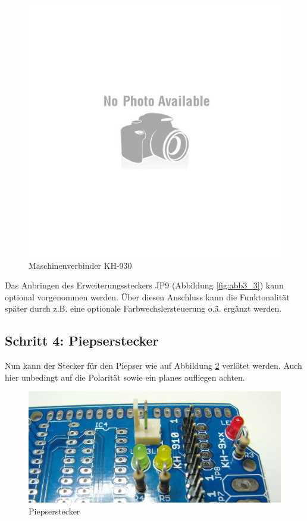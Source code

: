 \documentclass[fleqn,10pt]{SelfArx} %
\begin{document}
\begin{figure}[tbhp]\centering
\includegraphics[width=\linewidth]{no}
\caption{Maschinenverbinder KH-930}
\label{fig:abb3_4}
\end{figure}

Das Anbringen des Erweiterungssteckers JP9 (Abbildung \ref{fig:abb3_3}) kann optional vorgenommen werden. Über diesen Anschluss kann die Funktonalität später durch z.B. eine optionale Farbwechslersteuerung o.ä. ergänzt werden. \par

\FloatBarrier

 \subsection*{Schritt 4: Piepserstecker}

Nun kann der Stecker für den Piepser wie auf Abbildung \ref{fig:abb4_1} verlötet werden. Auch hier unbedingt auf die Polarität sowie ein planes aufliegen achten.

\begin{figure}[tbhp]\centering
\includegraphics[width=\linewidth]{abb4_1}
\caption{Piepserstecker}
\label{fig:abb4_1}
\end{figure}
\end{document}
